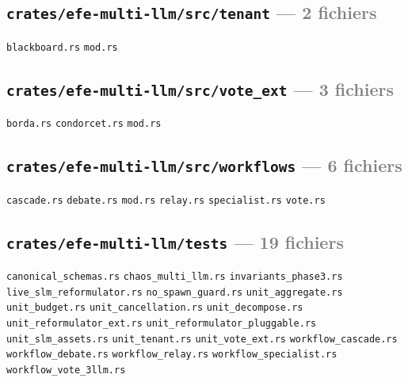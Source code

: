 \documentclass[10pt]{report}
\newcommand{\code}[1]{\texttt{\small #1}}
\begin{document}
\subsection*{\code{crates/efe-multi-llm/src/tenant} \normalfont\textcolor{grey}{--- 2 fichiers}}
\begin{sloppypar}\footnotesize\raggedright
\code{blackboard.rs} \;\textbullet\; \code{mod.rs}
\end{sloppypar}

\subsection*{\code{crates/efe-multi-llm/src/vote\_ext} \normalfont\textcolor{grey}{--- 3 fichiers}}
\begin{sloppypar}\footnotesize\raggedright
\code{borda.rs} \;\textbullet\; \code{condorcet.rs} \;\textbullet\; \code{mod.rs}
\end{sloppypar}

\subsection*{\code{crates/efe-multi-llm/src/workflows} \normalfont\textcolor{grey}{--- 6 fichiers}}
\begin{sloppypar}\footnotesize\raggedright
\code{cascade.rs} \;\textbullet\; \code{debate.rs} \;\textbullet\; \code{mod.rs} \;\textbullet\; \code{relay.rs} \;\textbullet\; \code{specialist.rs} \;\textbullet\; \code{vote.rs}
\end{sloppypar}

\subsection*{\code{crates/efe-multi-llm/tests} \normalfont\textcolor{grey}{--- 19 fichiers}}
\begin{sloppypar}\footnotesize\raggedright
\code{canonical\_schemas.rs} \;\textbullet\; \code{chaos\_multi\_llm.rs} \;\textbullet\; \code{invariants\_phase3.rs} \;\textbullet\; \code{live\_slm\_reformulator.rs} \;\textbullet\; \code{no\_spawn\_guard.rs} \;\textbullet\; \code{unit\_aggregate.rs} \;\textbullet\; \code{unit\_budget.rs} \;\textbullet\; \code{unit\_cancellation.rs} \;\textbullet\; \code{unit\_decompose.rs} \;\textbullet\; \code{unit\_reformulator\_ext.rs} \;\textbullet\; \code{unit\_reformulator\_pluggable.rs} \;\textbullet\; \code{unit\_slm\_assets.rs} \;\textbullet\; \code{unit\_tenant.rs} \;\textbullet\; \code{unit\_vote\_ext.rs} \;\textbullet\; \code{workflow\_cascade.rs} \;\textbullet\; \code{workflow\_debate.rs} \;\textbullet\; \code{workflow\_relay.rs} \;\textbullet\; \code{workflow\_specialist.rs} \;\textbullet\; \code{workflow\_vote\_3llm.rs}
\end{sloppypar}
\end{document}
